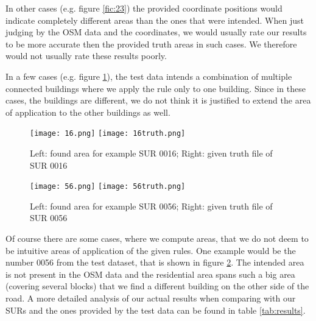 \documentclass[11pt,fleqn]{book} %
\begin{document}
In other cases (e.g. figure \ref{fic:23}) the provided coordinate positions would indicate completely different areas than the ones that were intended. When just judging by the OSM data and the coordinates, we would usually rate our results to be more accurate then the provided truth areas in such cases. We therefore would not usually rate these results poorly. 

In a few cases (e.g. figure \ref{fic:16}), the test data intends a combination of multiple connected buildings where we apply the rule only to one building. Since in these cases, the buildings are different, we do not think it is justified to extend the area of application to the other buildings as well. 

\begin{figure}
\texttt{[image: 16.png]}
\texttt{[image: 16truth.png]}
\caption{Left: found area for example SUR 0016; Right: given truth file of SUR 0016}
\label{fic:16}
\end{figure}
\begin{figure}
\texttt{[image: 56.png]}
\texttt{[image: 56truth.png]}
\caption{Left: found area for example SUR 0056; Right: given truth file of SUR 0056}
\label{fic:56}
\end{figure}

Of course there are some cases, where we compute areas, that we do not deem to be intuitive areas of application of the given rules. One example would be the number 0056 from the test dataset, that is shown in figure \ref{fic:56}. The intended area is not present in the OSM data and the residential area spans such a big area (covering several blocks) that we find a different building on the other side of the road. 
A more detailed analysis of our actual results when comparing with our SURs and the ones provided by the test data can be found in table \ref{tab:results}.
\end{document}
